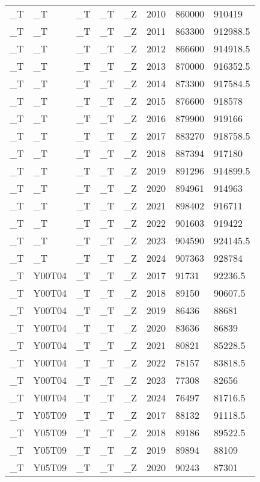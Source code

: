 \begin{longtable}[t]{llllllll}
\addlinespace
\_T & \_T & \_T & \_T & \_Z & 2010 & 860000 & 910419\\
\_T & \_T & \_T & \_T & \_Z & 2011 & 863300 & 912988.5\\
\_T & \_T & \_T & \_T & \_Z & 2012 & 866600 & 914918.5\\
\_T & \_T & \_T & \_T & \_Z & 2013 & 870000 & 916352.5\\
\_T & \_T & \_T & \_T & \_Z & 2014 & 873300 & 917584.5\\
\addlinespace
\_T & \_T & \_T & \_T & \_Z & 2015 & 876600 & 918578\\
\_T & \_T & \_T & \_T & \_Z & 2016 & 879900 & 919166\\
\_T & \_T & \_T & \_T & \_Z & 2017 & 883270 & 918758.5\\
\_T & \_T & \_T & \_T & \_Z & 2018 & 887394 & 917180\\
\_T & \_T & \_T & \_T & \_Z & 2019 & 891296 & 914899.5\\
\addlinespace
\_T & \_T & \_T & \_T & \_Z & 2020 & 894961 & 914963\\
\_T & \_T & \_T & \_T & \_Z & 2021 & 898402 & 916711\\
\_T & \_T & \_T & \_T & \_Z & 2022 & 901603 & 919422\\
\_T & \_T & \_T & \_T & \_Z & 2023 & 904590 & 924145.5\\
\_T & \_T & \_T & \_T & \_Z & 2024 & 907363 & 928784\\
\addlinespace
\_T & Y00T04 & \_T & \_T & \_Z & 2017 & 91731 & 92236.5\\
\_T & Y00T04 & \_T & \_T & \_Z & 2018 & 89150 & 90607.5\\
\_T & Y00T04 & \_T & \_T & \_Z & 2019 & 86436 & 88681\\
\_T & Y00T04 & \_T & \_T & \_Z & 2020 & 83636 & 86839\\
\_T & Y00T04 & \_T & \_T & \_Z & 2021 & 80821 & 85228.5\\
\addlinespace
\_T & Y00T04 & \_T & \_T & \_Z & 2022 & 78157 & 83818.5\\
\_T & Y00T04 & \_T & \_T & \_Z & 2023 & 77308 & 82656\\
\_T & Y00T04 & \_T & \_T & \_Z & 2024 & 76497 & 81716.5\\
\_T & Y05T09 & \_T & \_T & \_Z & 2017 & 88132 & 91118.5\\
\_T & Y05T09 & \_T & \_T & \_Z & 2018 & 89186 & 89522.5\\
\addlinespace
\_T & Y05T09 & \_T & \_T & \_Z & 2019 & 89894 & 88109\\
\_T & Y05T09 & \_T & \_T & \_Z & 2020 & 90243 & 87301\\

\end{longtable}
